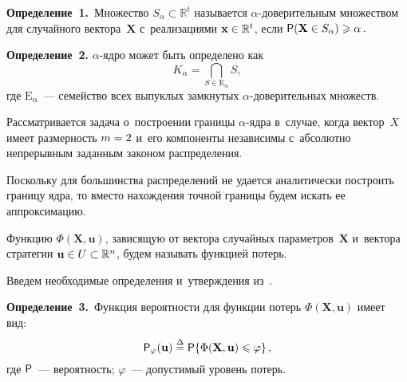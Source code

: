 \begin{multicols}{2}
\noindent
\textbf{Определение~1.}\
{Множество $S_\alpha \subset \mathbb R^t$  называется  
\mbox{$\alpha$-до}\-ве\-ри\-тель\-ным 
множеством для случайного вектора~$\mathbf X$ с~реализациями $\mathbf x \hm\in 
\mathbb R^t$, если}
${\sf P}(\mathbf X \in S_\alpha)\geqslant \alpha\,.$

\smallskip

\noindent
\textbf{Определение~2.}
{$\alpha$-яд\-ро может быть определено как}
\begin{equation*}
K_\alpha=\bigcap\limits_{S\in \mathrm{E_\alpha} }S,
\end{equation*}
где $\mathrm{E_\alpha}$~--- семейство всех вы\-пук\-лых замк\-ну\-тых 
\mbox{$\alpha$-до}\-ве\-ри\-тель\-ных множеств.

\smallskip

Рассматривается задача о~построении границы $\alpha$-яд\-ра в~случае, когда век\-тор~$X$ 
имеет размерность $m\hm=2$  и~его компоненты независимы с~абсолютно 
непрерывным заданным законом рас\-пре\-де\-ле\-ния.

Поскольку для большинства распределений не удается аналитически 
по\-стро\-ить границу ядра, то вместо на\-хож\-де\-ния точ\-ной границы будем 
искать ее аппроксимацию.


Функцию $\Phi(\mathbf X,\mathbf u)$, зависящую от век\-то\-ра случайных 
па\-ра\-мет\-ров~$\mathbf X$ и~вектора стратегии $\mathbf u\hm\in U\subset \mathbb R^n$, 
будем называть функ\-ци\-ей потерь.


Введем необходимые определения и~утверждения из~\cite{kankibzun}.

\smallskip

\noindent
\textbf{Определение~3.}\
{Функция вероятности для функции потерь $\Phi(\mathbf X,\mathbf u)$ имеет вид}:
\begin{equation*}
 {\sf P}_\varphi (\mathbf u)\;{\stackrel{\Delta}{=}}\;
 {\sf P}\{\Phi(\mathbf X,\mathbf u)\leqslant \varphi\}\,,
\end{equation*}
{где ${\sf P}$~--- вероятность; $\varphi$~--- допустимый уровень потерь.}

\smallskip


\end{multicols}

